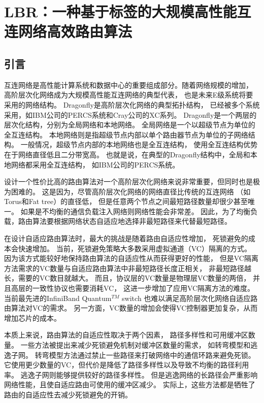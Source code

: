\chapter{LBR：一种基于标签的大规模高性能互连网络高效路由算法}

\section{引言}

互连网络是高性能计算系统和数据中心的重要组成部分。随着网络规模的增加，
高阶层次化网络成为大规模高性能互连网络的典型代表，
也是未来E级系统将要采用的网络结构。
Dragonfly是高阶层次化网络的典型拓扑结构，
已经被多个系统采用，如IBM公司的PERCS系统和Cray公司的XC系列。
Dragonfly是一个两层的层次化结构，分别为全局网络和本地网络。
全局网络是一个以超级节点为单位的全互连结构。
本地网络则是指超级节点内部以单个路由器节点为单位的子网络结构。
一般情况，超级节点内部的本地网络也是全互连结构，
使用全互连结构优势在于网络直径低且二分带宽高。
也就是说，在典型的Dragonfly结构中，全局和本地网络都采用全互连结构，
如IBM公司的PERCS系统。

设计一个性价比高的路由算法对一个高阶层次化网络来说非常重要，但同时也是极为困难的。
这是因为，尽管高阶层次化网络的网络直径比传统的互连网络
（如Torus和Fat tree）的直径低，
但是任意两个节点之间最短路径数量却很少甚至唯一。
如果是不均衡的通信负载注入网络则网络性能会非常差。
因此，为了均衡负载，路由算法要根据网络状态自适应地选择非最短路径来代替最短路径。

在设计自适应路由算法时，最大的挑战是随着路由自适应性增加，
死锁避免的成本会快速增加。
当前，死锁避免策略大多数采用虚拟通道（VC）隔离的方式。
因为该方式能较好地保持路由算法的自适应性从而获得更好的性能，
但是VC隔离方法需求的VC数量与自适应路由算法中非最短路径长度正相关，
非最短路径越长，需要的VC数目就越大。
而且，协议层的VC数量是物理层VC数量的两倍，
并且高层的一致性协议也需要消耗VC，
这进一步增加了应用VC隔离方法的难度。
当前最先进的InfiniBand Quantum$^{TM}$ switch
也难以满足高阶层次化网络自适应路由算法对VC的需求。
另一方面，VC数量的增加会使得VC控制器更加复杂，从而增加芯片的成本。

本质上来说，路由算法的自适应性取决于两个因素，
路径多样性和可用缓冲区数量。
一些方法被提出来减少死锁避免机制对缓冲区数量的需求，
如转弯模型和逃逸子网。
转弯模型方法通过禁止一些路径来打破网络中的通信环路来避免死锁。
它使用更少数量的VC，但代价是降低了路径多样性以及导致不均衡的路径利用率。
逃逸子网则能够提供较好的路径多样性。
但是逃逸网络的长路径会严重影响网络性能，且使自适应路由可使用的缓冲区减少。
实际上，这些方法都是牺牲了路由的自适应性去减少死锁避免的开销。

